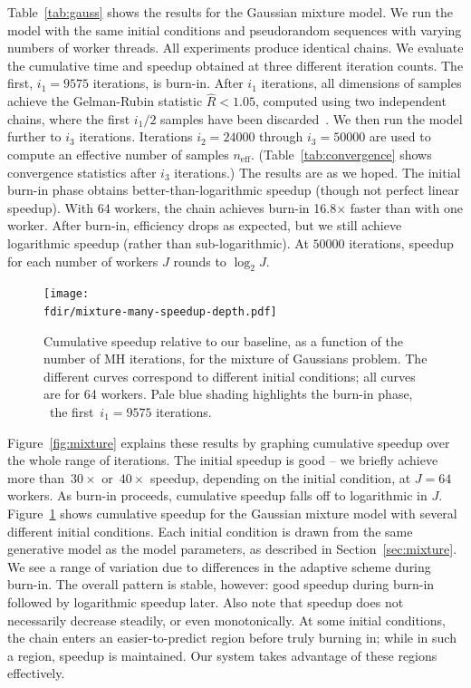 \documentclass[angelino.tex]{subfiles}
\newcommand{\fdir}{/Users/elaine/Dropbox/nips12-mcmc/consolidate/mixture-thesis}
\begin{document}
Table~\ref{tab:gauss} shows the results for the Gaussian mixture model.
%
We run the model with the same initial conditions and pseudorandom sequences with varying numbers of worker threads. All experiments produce identical chains.
%
We evaluate the cumulative time and speedup obtained at three different iteration counts.
%
The first, ${i_1 = 9575}$ iterations, is burn-in. After $i_1$ iterations, all dimensions of samples achieve the Gelman-Rubin statistic ${\hat R < 1.05}$, computed using two independent chains, where the first $i_1/2$ samples have been discarded~\citep{gelman:1992-inference}.
%
We then run the model further to $i_3$ iterations. Iterations ${i_2 = 24000}$ through ${i_3 = 50000}$ are used to compute an effective number of samples $n_\text{eff}$. (Table~\ref{tab:convergence} shows convergence statistics after $i_3$ iterations.)
%
The results are as we hoped. The initial burn-in phase obtains better-than-logarithmic speedup (though not perfect linear speedup).  With 64 workers, the chain achieves burn-in 16.8$\times$ faster than with one worker.
%
After burn-in, efficiency drops as expected, but we still achieve logarithmic speedup (rather than sub-logarithmic). At $50000$ iterations, speedup for each number of workers $J$ rounds to $\log_2 J$.



\begin{figure}[t!]
\begin{center}
\texttt{[image: \\fdir/mixture-many-speedup-depth.pdf]}
\end{center}
\caption{Cumulative speedup relative to our baseline,
as a function of the number of MH iterations, for the mixture of Gaussians problem.
The different curves correspond to different initial conditions;
all curves are for 64 workers.
Pale blue shading highlights the burn-in phase, \ie~the first~${i_1 = 9575}$ iterations.}
\label{fig:initcond}
\end{figure}

Figure~\ref{fig:mixture} explains these results by graphing cumulative speedup over the whole range of iterations.
%
The initial speedup is good -- we briefly achieve more than~$30\times$ or~$40\times$ speedup, depending on the initial condition, at ${J = 64}$ workers.
%
As burn-in proceeds, cumulative speedup falls off to logarithmic in $J$.
%
Figure~\ref{fig:initcond} shows cumulative speedup for the Gaussian mixture model with several different initial conditions.
%
Each initial condition is drawn from the same generative model as the model parameters, as described in Section~\ref{sec:mixture}.
%
We see a range of variation due to differences in the adaptive scheme during burn-in.
%
The overall pattern is stable, however: good speedup during burn-in followed by logarithmic speedup later.
%
Also note that speedup does not necessarily decrease steadily, or even monotonically. At some initial conditions, the chain enters an easier-to-predict region before truly burning in; while in such a region, speedup is maintained. Our system takes advantage of these regions effectively.
\end{document}
